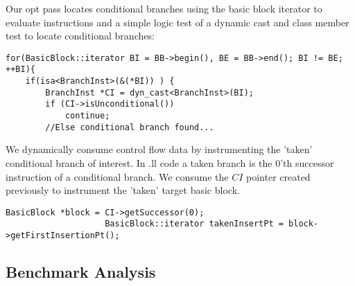 Our opt pass locates conditional branches using the basic block iterator to evaluate instructions and a simple logic test of a dynamic cast and class member test to locate conditional branches:\\

\begin{frame}[fragile]
\begin{lstlisting}
for(BasicBlock::iterator BI = BB->begin(), BE = BB->end(); BI != BE; ++BI){
	if(isa<BranchInst>(&(*BI)) ) {
    	BranchInst *CI = dyn_cast<BranchInst>(BI);
        if (CI->isUnconditional())
        	continue; 
		//Else conditional branch found...
\end{lstlisting}
\end{frame}

We dynamically consume control flow data by instrumenting the 'taken' conditional branch of interest. In .ll code a taken branch is the 0'th successor instruction of a conditional branch. We consume the $CI$ pointer created previously to instrument the 'taken' target basic block.\\

\begin{frame}[fragile]
\begin{lstlisting}
BasicBlock *block = CI->getSuccessor(0);
                    BasicBlock::iterator takenInsertPt = block->getFirstInsertionPt();
\end{lstlisting}
\end{frame}
  

\subsection{Benchmark Analysis}